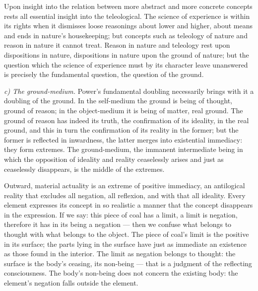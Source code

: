 \documentclass[12pt,a4paper]{book}
\newcommand{\runin}[1]{\emph{#1}\hspace{0.4em}}
\begin{document}
Upon insight into the relation between more abstract and more concrete concepts rests all essential insight into the
teleological. The science of experience is within its rights when it dismisses loose reasonings about lower and
higher, about means and ends in nature's housekeeping; but concepts such as teleology of nature and reason in nature
it cannot treat. Reason in nature and teleology rest upon dispositions in nature, dispositions in nature upon the
ground of nature; but the question which the science of experience must by its character leave unanswered is
precisely the fundamental question, the question of the ground.

\runin{c) The ground-medium.} Power's fundamental doubling necessarily brings with it a doubling of the ground. In
the self-medium the ground is being of thought, ground of reason; in the object-medium it is being of matter, real
ground. The ground of reason has indeed its truth, the confirmation of its ideality, in the real ground, and this in
turn the confirmation of its reality in the former; but the former is reflected in inwardness, the latter merges into
existential immediacy: they form extremes. The ground-medium, the immanent intermediate being in which the opposition
of ideality and reality ceaselessly arises and just as ceaselessly disappears, is the middle of the extremes.

Outward, material actuality is an extreme of positive immediacy, an antilogical reality that excludes all negation,
all reflexion, and with that all ideality. Every element expresses its concept in so realistic a manner that the
concept disappears in the expression. If we say: this piece of coal has a limit, a limit is negation, therefore it
has in its being a negation --- then we confuse what belongs to thought with what belongs to the object. The piece of
coal's
limit is the positive in its surface; the parts lying in the surface have just as immediate an existence as those
found in the interior. The limit as negation belongs to thought: the surface is the body's ceasing, its non-being ---
that is a judgment of the reflecting consciousness. The body's non-being does not concern the existing body: the
element's negation falls outside the element.
\end{document}

